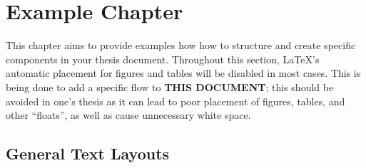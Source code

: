 \chapter{Example Chapter}\label{ch:ExampleChapter}
	\lstset{style=LaTeXStyle}
	This chapter aims to provide examples how how to structure and create specific components in your thesis document.
	Throughout this section, \LaTeX's automatic placement for figures and tables will be disabled in most cases.
	This is being done to add a specific flow to \textbf{THIS DOCUMENT}; this should be avoided in one's thesis as it can lead to poor placement of figures, tables, and other \enquote{floats}, as well as cause unnecessary white space.
	\section{General Text Layouts}
